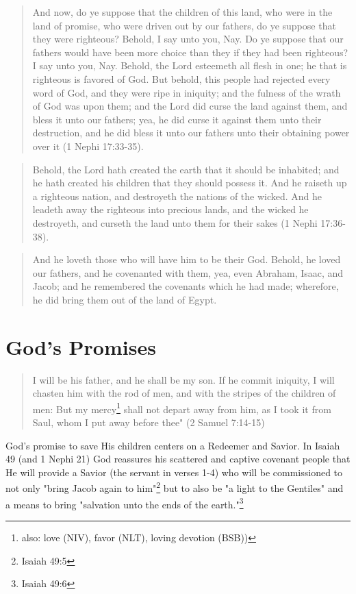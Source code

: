 \begin{quotation}
And now, do ye suppose that the children of this land, who were in the land of promise, who were driven out by our fathers, do ye suppose that they were righteous? Behold, I say unto you, Nay. Do ye suppose that our fathers would have been more choice than they if they had been righteous? I say unto you, Nay. Behold, the Lord esteemeth all flesh in one; he that is righteous is favored of God. But behold, this people had rejected every word of God, and they were ripe in iniquity; and the fulness of the wrath of God was upon them; and the Lord did curse the land against them, and bless it unto our fathers; yea, he did curse it against them unto their destruction, and he did bless it unto our fathers unto their obtaining power over it (1 Nephi 17:33-35).
\end{quotation}

\begin{quotation}
Behold, the Lord hath created the earth that it should be inhabited; and he hath created his children that they should possess it. And he raiseth up a righteous nation, and destroyeth the nations of the wicked. And he leadeth away the righteous into precious lands, and the wicked he destroyeth, and curseth the land unto them for their sakes (1 Nephi 17:36-38).
\end{quotation}

\begin{quotation}
And he loveth those who will have him to be their God. Behold, he loved our fathers, and he covenanted with them, yea, even Abraham, Isaac, and Jacob; and he remembered the covenants which he had made; wherefore, he did bring them out of the land of Egypt. 
\end{quotation}


\section{God's Promises}

\begin{quotation}
I will be his father, and he shall be my son. If he commit iniquity, I will chasten him with the rod of men, and with the stripes of the children of men: But my mercy\footnote{also: love (NIV), favor (NLT), loving devotion (BSB))} shall not depart away from him, as I took it from Saul, whom I put away before thee" (2 Samuel 7:14-15)
\end{quotation}

God's promise to save His children centers on a Redeemer and Savior. In Isaiah 49 (and 1 Nephi 21) God reassures his scattered and captive covenant people that He will provide a Savior (the servant in verses 1-4) who will be commissioned to not only "bring Jacob again to him"\footnote{Isaiah 49:5} but to also be "a light to the Gentiles" and a means to bring "salvation unto the ends of the earth."\footnote{Isaiah 49:6}

